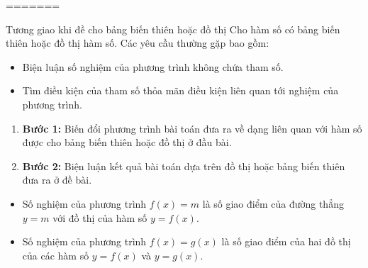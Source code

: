 =======
\begin{dang}{Tương giao khi đề cho bảng biến thiên hoặc đồ thị}
    \baitoan Cho hàm số có bảng biến thiên hoặc đồ thị hàm số. Các yêu cầu thường gặp bao gồm:
    \begin{itemize}
        \item Biện luận số nghiệm của phương trình không chứa tham số.
        \item Tìm điều kiện của tham số thỏa mãn điều kiện liên quan tới nghiệm của phương trình.
    \end{itemize}
    \phuongphap
    \begin{enumerate}
        \item[] {\bf Bước 1:} Biến đổi phương trình bài toán đưa ra về dạng liên quan với hàm số được cho bảng biến thiên hoặc đồ thị ở đầu bài.
        \item[] {\bf Bước 2:} Biện luận kết quả bài toán dựa trên đồ thị hoặc bảng biến thiên đưa ra ở đề bài.
    \end{enumerate}
    \begin{note}
        \begin{itemize}
            \item Số nghiệm của phương trình $f(x)=m$ là số giao điểm của đường thẳng $y=m$ với đồ thị của hàm số $y=f(x)$.
            \item Số nghiệm của phương trình $f(x)=g(x)$ là số giao điểm của hai đồ thị của các hàm số $y=f(x)$ và $y=g(x)$.
        \end{itemize}
    \end{note}
\end{dang}
